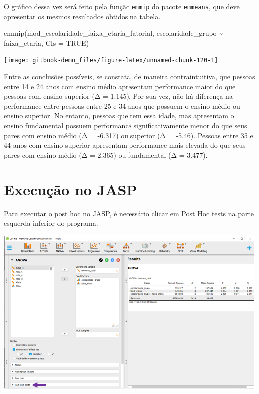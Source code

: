 \documentclass[
]{book}
\newenvironment{Shaded}{\begin{snugshade}}{\end{snugshade}}
\newcommand{\AttributeTok}[1]{\textcolor[rgb]{0.77,0.63,0.00}{#1}}
\newcommand{\ConstantTok}[1]{\textcolor[rgb]{0.00,0.00,0.00}{#1}}
\newcommand{\FunctionTok}[1]{\textcolor[rgb]{0.00,0.00,0.00}{#1}}
\newcommand{\NormalTok}[1]{#1}
\newcommand{\SpecialCharTok}[1]{\textcolor[rgb]{0.00,0.00,0.00}{#1}}
\begin{document}
O gráfico dessa vez será feito pela função \texttt{emmip} do pacote \texttt{emmeans}, que deve apresentar os mesmos resultados obtidos na tabela.

\begin{Shaded}
\begin{Highlighting}[]
\FunctionTok{emmip}\NormalTok{(mod\_escolaridade\_faixa\_etaria\_fatorial, }
\NormalTok{      escolaridade\_grupo }\SpecialCharTok{\textasciitilde{}}\NormalTok{ faixa\_etaria, }\AttributeTok{CIs =} \ConstantTok{TRUE}\NormalTok{)}
\end{Highlighting}
\end{Shaded}

\begin{center}\texttt{[image: gitbook-demo\_files/figure-latex/unnamed-chunk-120-1]} \end{center}

Entre as conclusões possíveis, se constata, de maneira contraintuitiva, que pessoas entre 14 e 24 anos com ensino médio apresentam performance maior do que pessoas com ensino superior (Δ = 1.145). Por sua vez, não há diferença na performance entre pessoas entre 25 e 34 anos que possuem o ensino médio ou ensino superior. No entanto, pessoas que tem essa idade, mas apresentam o ensino fundamental possuem performance significativamente menor do que seus pares com ensino médio (Δ = -6.317) ou superior (Δ = -5.46). Pessoas entre 35 e 44 anos com ensino superior apresentam performance mais elevada do que seus pares com ensino médio (Δ = 2.365) ou fundamental (Δ = 3.477).

\hypertarget{execuuxe7uxe3o-no-jasp-11}{%
\section{Execução no JASP}\label{execuuxe7uxe3o-no-jasp-11}}

Para executar o post hoc no JASP, é necessário clicar em Post Hoc tests na parte esquerda inferior do programa.

\includegraphics{./img/cap_anova_fatorial_posthoc.png}
\end{document}
